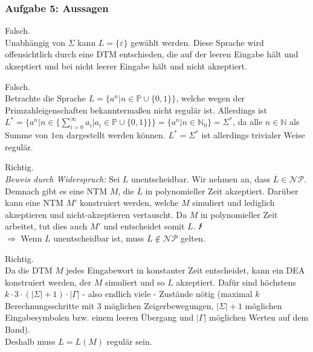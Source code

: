 \newpage
\subsubsection{Aufgabe 5: Aussagen}
\begin{teile}
	\item
	Falsch.\\
	Unabhängig von $\Sigma$ kann $L=\{\varepsilon \}$ gewählt werden. Diese Sprache wird offensichtlich durch eine DTM entschieden, die auf der leeren Eingabe hält und akzeptiert und bei nicht leerer Eingabe hält und nicht akzeptiert.
	
	\item
	Falsch.\\
	Betrachte die Sprache $L=\{a^n \vert n\in \mathbb{P}\cup \{0,1\}\}$, welche wegen der Primzahleigenschaften bekanntermaßen nicht regulär ist. Allerdings ist $L^*=\{a^n \vert n\in \{\sum_{i = 0}^{\infty} a_i \vert a_i \in \mathbb{P}\cup \{0,1\}\}\}=\{a^n \vert n\in \mathbb{N}_0\}=\Sigma^*$, da alle $n \in \mathbb{N}$ als Summe von $1$en dargestellt werden können. $L^*=\Sigma^*$ ist allerdings trivialer Weise regulär.
	
	\item
	Richtig.\\
	\textit{Beweis durch Widerspruch:} Sei $L$ unentscheidbar. Wir nehmen an, dass $\overline{L} \in \mathcal{NP}$. Demnach gibt es eine NTM $M$, die $\overline{L}$ in polynomieller Zeit akzeptiert. %
	Darüber kann eine NTM $M'$ konstruiert werden, welche $M$ simuliert und lediglich akzeptieren und nicht-akzeptieren vertauscht. Da $M$ in polynomieller Zeit arbeitet, tut dies auch $M'$ und entscheidet somit $L$. $\mbox{\Lightning}$\\
	$\Rightarrow$ Wenn $L$ unentscheidbar ist, muss $\overline{L} \notin \mathcal{NP}$ gelten.

	\item
	Richtig.\\
	Da die DTM $M$ jedes Eingabewort in konstanter Zeit entscheidet, kann ein DEA konstruiert werden, der $M$ simuliert und so $L$ akzeptiert. Dafür sind höchstens $k\cdot 3\cdot(|\Sigma|+1)\cdot |\Gamma|$ - also endlich viele - Zustände nötig (maximal $k$ Berechnungsschritte mit $3$ möglichen Zeigerbewegungen, $|\Sigma|+1$ möglichen Eingabesymbolen bzw. einem leeren Übergang und $|\Gamma|$ möglichen Werten auf dem Band).\\
	Deshalb muss $L=L(M)$ regulär sein.
\end{teile}